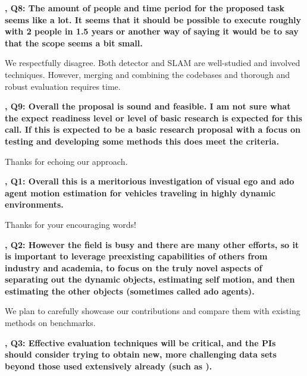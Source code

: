 \documentclass[12pt]{article}
\newcommand{\revThree}{{\color{my_magenta}{R3}}}
\newcommand{\revFour}{{\color{my_blue}{R4}}}
\begin{document}
    \textbf{\revThree, Q8: The amount of people and time period for the proposed task seems like a lot. It seems that it should be possible to execute roughly with 2 people in 1.5 years or another way of saying it would be to say that the scope seems a bit small.}

    We respectfully disagree. Both detector and SLAM are well-studied and involved techniques. 
    However, merging and combining the codebases and thorough and robust evaluation requires time.

    \textbf{\revThree, Q9: Overall the proposal is sound and feasible. I am not sure what the expect readiness level or level of basic research is expected for this call. If this is expected to be a basic research proposal with a focus on testing and developing some methods this does meet the criteria.
    }

    Thanks for echoing our approach. 

\clearpage

    \textbf{\revFour, Q1: Overall this is a meritorious investigation of visual ego and ado agent motion estimation for vehicles traveling in highly dynamic environments.}

    Thanks for your encouraging words!

    \textbf{\revFour, Q2: However the field is busy and there are many other efforts, so it is important to leverage preexisting capabilities of others from industry and academia, to focus on the truly novel aspects of separating out the dynamic objects, estimating self motion, and then estimating the other objects (sometimes called ado agents).
    }

    We plan to carefully showcase our contributions and compare them with existing methods on benchmarks. 

    \textbf{\revFour, Q3: Effective evaluation techniques will be critical, and the PIs should consider trying to obtain new, more challenging data sets beyond those used extensively already (such as \kitti).}
\end{document}
